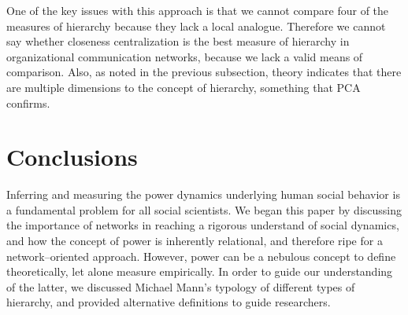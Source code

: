 \documentclass[3p,times]{elsarticle}
\begin{document}
One of the key issues with this approach is that we cannot compare four of the measures of hierarchy because they lack a local analogue. Therefore we cannot say whether closeness centralization is the best measure of hierarchy in organizational communication networks, because we lack a valid means of comparison. Also, as noted in the previous subsection, theory indicates that there are multiple dimensions to the concept of hierarchy, something that PCA confirms. 




%



\section{Conclusions}
Inferring and measuring the power dynamics underlying human social behavior is a fundamental problem for all social scientists. We began this paper by discussing the importance of networks in reaching a rigorous understand of social dynamics, and how the concept of power is inherently relational, and therefore ripe for a network--oriented approach. However, power can be a nebulous concept to define theoretically, let alone measure empirically. In order to guide our understanding of the latter, we discussed Michael Mann's typology of different types of hierarchy, and provided alternative definitions to guide researchers.
\end{document}
